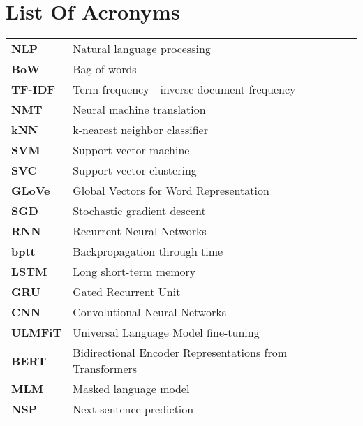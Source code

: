 \chapter{List Of Acronyms}

\begin{table}[h]
\begin{tabular}{ll}

  \textbf{NLP} & Natural language processing \\
  \textbf{BoW} & Bag of words \\
  \textbf{TF-IDF} & Term frequency - inverse document frequency\\
  \textbf{NMT} & Neural machine translation\\
  \textbf{kNN} & k-nearest neighbor classifier\\
  \textbf{SVM} & Support vector machine\\
  \textbf{SVC} & Support vector clustering\\
  \textbf{GLoVe} & Global Vectors for Word Representation \\
  \textbf{SGD} & Stochastic gradient descent \\
  \textbf{RNN} & Recurrent Neural Networks \\
  \textbf{bptt} & Backpropagation through time\\
  \textbf{LSTM} & Long short-term memory \\
  \textbf{GRU} & Gated Recurrent Unit\\
  \textbf{CNN} & Convolutional Neural Networks \\
  \textbf{ULMFiT} & Universal Language Model fine-tuning \\
  \textbf{BERT} & Bidirectional Encoder Representations from Transformers \\
  \textbf{MLM} & Masked language model\\
  \textbf{NSP} & Next sentence prediction\\
\end{tabular}
\end{table}
